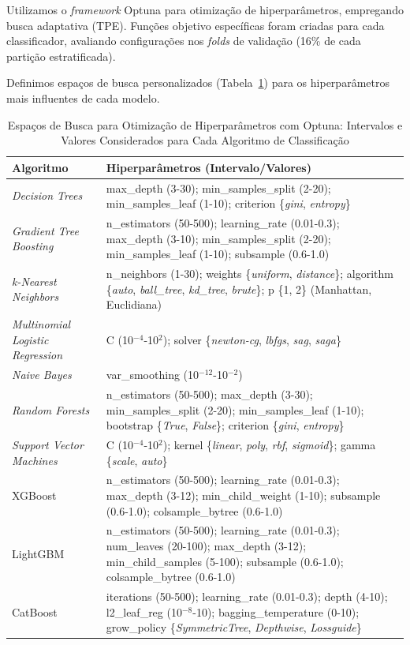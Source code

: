 \documentclass[12pt]{article}
\begin{document}
Utilizamos o \textit{framework} Optuna \cite{akiba2019optuna} para otimização de hiperparâmetros, empregando busca adaptativa (TPE). Funções objetivo específicas foram criadas para cada classificador, avaliando configurações nos \textit{folds} de validação (16\% de cada partição estratificada).

Definimos espaços de busca personalizados (Tabela~\ref{tab:hiperparametros}) para os hiperparâmetros mais influentes de cada modelo.

\begin{table}[htbp]
\centering
\scriptsize 
\caption{Espaços de Busca para Otimização de Hiperparâmetros com Optuna: Intervalos e Valores Considerados para Cada Algoritmo de Classificação} %
\label{tab:hiperparametros}
\begin{tabularx}{\textwidth}{|p{2.2cm}|X|} 
\hline
\textbf{Algoritmo} & \textbf{Hiperparâmetros (Intervalo/Valores)} \\
\hline
\textit{Decision Trees} & max\_depth (3-30); min\_samples\_split (2-20); min\_samples\_leaf (1-10); criterion \{\textit{gini}, \textit{entropy}\} \\ 
\hline
\textit{Gradient Tree Boosting} & n\_estimators (50-500); learning\_rate (0.01-0.3); max\_depth (3-10); min\_samples\_split (2-20); min\_samples\_leaf (1-10); subsample (0.6-1.0) \\
\hline
\textit{k-Nearest Neighbors} & n\_neighbors (1-30); weights \{\textit{uniform}, \textit{distance}\}; algorithm \{\textit{auto}, \textit{ball\_tree}, \textit{kd\_tree}, \textit{brute}\}; p \{1, 2\} (Manhattan, Euclidiana) \\ 
\hline
\textit{Multinomial Logistic Regression} & C (10$^{-4}$-10$^{2}$); solver \{\textit{newton-cg}, \textit{lbfgs}, \textit{sag}, \textit{saga}\} \\ 
\hline
\textit{Naive Bayes} & var\_smoothing (10$^{-12}$-10$^{-2}$) \\
\hline
\textit{Random Forests} & n\_estimators (50-500); max\_depth (3-30); min\_samples\_split (2-20); min\_samples\_leaf (1-10); bootstrap \{\textit{True}, \textit{False}\}; criterion \{\textit{gini}, \textit{entropy}\} \\ 
\hline
\textit{Support Vector Machines} & C (10$^{-4}$-10$^{2}$); kernel \{\textit{linear}, \textit{poly}, \textit{rbf}, \textit{sigmoid}\}; gamma \{\textit{scale}, \textit{auto}\} \\ 
\hline
XGBoost & n\_estimators (50-500); learning\_rate (0.01-0.3); max\_depth (3-12); min\_child\_weight (1-10); subsample (0.6-1.0); colsample\_bytree (0.6-1.0) \\
\hline
LightGBM & n\_estimators (50-500); learning\_rate (0.01-0.3); num\_leaves (20-100); max\_depth (3-12); min\_child\_samples (5-100); subsample (0.6-1.0); colsample\_bytree (0.6-1.0) \\
\hline
CatBoost & iterations (50-500); learning\_rate (0.01-0.3); depth (4-10); l2\_leaf\_reg (10$^{-8}$-10); bagging\_temperature (0-10); grow\_policy \{\textit{SymmetricTree}, \textit{Depthwise}, \textit{Lossguide}\} \\ 
\hline
\end{tabularx}
\end{table}
\end{document}
